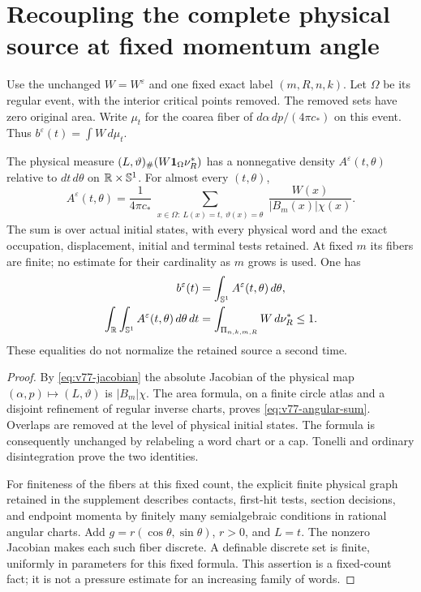 \section{Recoupling the complete physical source at fixed momentum angle}
\label{sec:v77-recoupling}
Use the unchanged $W=W^\varepsilon$ and one fixed exact label
$(m,R,n,k)$. Let $\Omega$ be its regular event, with the interior
critical points removed. The removed sets have zero original area.
Write $\mu_t$ for the coarea fiber of
$d\alpha\,dp/(4\pi c_*)$ on this event. Thus
$b^\varepsilon(t)=\int W\,d\mu_t$.

\begin{theorem}
\label{thm:v77-angular-source}
The physical measure $(L,\vartheta)_\#(W\mathbf1_\Omega\nu_R^*)$
has a nonnegative density $A^\varepsilon(t,\theta)$ relative to
$dt\,d\theta$ on $\mathbb R\times\mathbb S^1$. For almost every $(t,\theta)$,
\begin{equation}\label{eq:v77-angular-sum}
 A^\varepsilon(t,\theta)=
 \frac1{4\pi c_*}
 \sum_{\substack{x\in\Omega:\ L(x)=t,\ \vartheta(x)=\theta}}
                       \frac{W(x)}{|B_m(x)|\chi(x)}.
\end{equation}
The sum is over actual initial states, with every physical word and
the exact occupation, displacement, initial and terminal tests retained.
At fixed $m$ its fibers are finite; no estimate for their cardinality
as $m$ grows is used. One has
\begin{align}
 b^\varepsilon(t)&=\int_{\mathbb S^1}A^\varepsilon(t,\theta)\,d\theta,
                                      \label{eq:v77-angular-marginal}\\
 \int_\R\int_{\mathbb S^1}A^\varepsilon(t,\theta)\,d\theta\,dt
  &=\int_{\Pi_{n,k,m,R}}W\,d\nu_R^*\le1.
                                      \label{eq:v77-angular-total}
\end{align}
These equalities do not normalize the retained source a second time.
\end{theorem}
\begin{proof}
By \eqref{eq:v77-jacobian} the absolute Jacobian of the physical
map $(\alpha,p)\mapsto(L,\vartheta)$ is $|B_m|\chi$.
The area formula, on a finite circle atlas and a disjoint refinement
of regular inverse charts, proves \eqref{eq:v77-angular-sum}.
Overlaps are removed at the level of physical initial states. The
formula is consequently unchanged by relabeling a word chart or a
cap. Tonelli and ordinary disintegration prove the two identities.

For finiteness of the fibers at this fixed count, the explicit
finite physical graph retained in the supplement describes contacts,
first-hit tests, section decisions, and endpoint momenta by finitely
many semialgebraic conditions in rational angular charts. Add
$g=r(\cos\theta,\sin\theta)$, $r>0$, and $L=t$.
The nonzero Jacobian makes each such fiber discrete. A definable
discrete set is finite, uniformly in parameters for this fixed
formula. This assertion is a fixed-count fact; it is not a pressure
estimate for an increasing family of words.
\end{proof}

